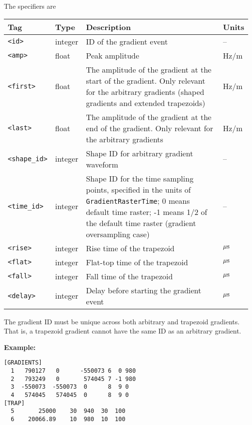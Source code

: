 \documentclass{article}
\begin{document}
The specifiers are

\begin{tabularx}{\textwidth}{llXl}
\toprule
Tag & Type & Description & Units\\
\midrule
\verb.<id>. & integer & ID of the gradient event & -- \\
\verb.<amp>. & float & Peak amplitude & Hz/m \\
\verb.<first>. & float & The amplitude of the gradient at the start of the gradient. Only relevant for the arbitrary gradients (shaped gradients and extended trapezoids) & Hz/m \\
\verb.<last>. & float & The amplitude of the gradient at the end of the gradient. Only relevant for the arbitrary gradients & Hz/m \\
\verb.<shape_id>. & integer & Shape ID for arbitrary gradient waveform & -- \\
\verb.<time_id>. & integer & Shape ID for the time sampling points, specified in the units of \verb.GradientRasterTime.; 0 means default time raster; -1 means 1/2 of the default time raster (gradient oversampling case) & -- \\
\verb.<rise>. & integer & Rise time of the trapezoid & $\rm \mu s$ \\
\verb.<flat>. & integer & Flat-top time of the trapezoid & $\rm \mu s$ \\
\verb.<fall>. & integer & Fall time of the trapezoid & $\rm \mu s$ \\
\verb.<delay>. & integer & Delay before starting the gradient event & $\rm \mu s$\\
\bottomrule
\end{tabularx}

The gradient ID must be unique across both arbitrary and trapezoid gradients. That is, a trapezoid gradient cannot have the same ID as an arbitrary gradient.


\begin{minipage}{\textwidth}
\textbf{Example:}
\begin{lstlisting}
[GRADIENTS]
  1   790127   0      -550073 6  0 980
  2   793249   0       574045 7 -1 980
  3  -550073  -550073  0      8  9 0
  4   574045   574045  0      8  9 0
[TRAP]
  5       25000    30  940  30  100
  6    20066.89    10  980  10  100
\end{lstlisting}
\end{minipage}
\end{document}
